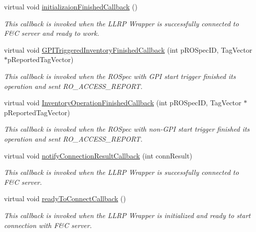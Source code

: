 \begin{DoxyCompactItemize}
virtual void \hyperlink{class_e_l_f_i_n_1_1_stub_reader_app_afb38719e5bd42ea03c4cd7d396b24f33}{initializaion\-Finished\-Callback} ()
\begin{DoxyCompactList}\small\item\em This callback is invoked when the L\-L\-R\-P Wrapper is successfully connected to F\&C server and ready to work. \end{DoxyCompactList}\item 
virtual void \hyperlink{class_e_l_f_i_n_1_1_stub_reader_app_a735d892b7f4bc81d21076bea419d23cd}{G\-P\-I\-Triggered\-Inventory\-Finished\-Callback} (int p\-R\-O\-Spec\-I\-D, Tag\-Vector $\ast$p\-Reported\-Tag\-Vector)
\begin{DoxyCompactList}\small\item\em This callback is invoked when the R\-O\-Spec with G\-P\-I start trigger finished its operation and sent R\-O\-\_\-\-A\-C\-C\-E\-S\-S\-\_\-\-R\-E\-P\-O\-R\-T. \end{DoxyCompactList}\item 
virtual void \hyperlink{class_e_l_f_i_n_1_1_stub_reader_app_a543e972efc7806cf15338aa21a4c148a}{Inventory\-Operation\-Finished\-Callback} (int p\-R\-O\-Spec\-I\-D, Tag\-Vector $\ast$p\-Reported\-Tag\-Vector)
\begin{DoxyCompactList}\small\item\em This callback is invoked when the R\-O\-Spec with non-\/\-G\-P\-I start trigger finished its operation and sent R\-O\-\_\-\-A\-C\-C\-E\-S\-S\-\_\-\-R\-E\-P\-O\-R\-T. \end{DoxyCompactList}\item 
virtual void \hyperlink{class_e_l_f_i_n_1_1_stub_reader_app_ac904a86d2a2e9b2f53d5c241b67426c7}{notify\-Connection\-Result\-Callback} (int conn\-Result)
\begin{DoxyCompactList}\small\item\em This callback is invoked when the L\-L\-R\-P Wrapper is successfully connected to F\&C server. \end{DoxyCompactList}\item 
virtual void \hyperlink{class_e_l_f_i_n_1_1_stub_reader_app_abb3f9fb61d1cadf87438e60271ad4bbd}{ready\-To\-Connect\-Callback} ()
\begin{DoxyCompactList}\small\item\em This callback is invoked when the L\-L\-R\-P Wrapper is initialized and ready to start connection with F\&C server. \end{DoxyCompactList}\item 

\end{DoxyCompactItemize}
